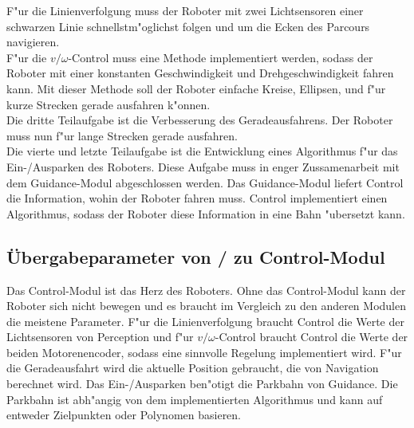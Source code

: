 F"ur die Linienverfolgung muss der Roboter mit zwei Lichtsensoren einer schwarzen Linie schnellstm"oglichst folgen und um die Ecken des Parcours navigieren. \\

F"ur die \(v/\omega\)-Control muss eine Methode implementiert werden, sodass der Roboter mit einer konstanten Geschwindigkeit und Drehgeschwindigkeit fahren kann. Mit dieser Methode soll der Roboter einfache Kreise, Ellipsen, und f"ur kurze Strecken gerade ausfahren k"onnen. \\

Die dritte Teilaufgabe ist die Verbesserung des Geradeausfahrens. Der Roboter muss nun f"ur lange Strecken gerade ausfahren. \\

Die vierte und letzte Teilaufgabe ist die Entwicklung eines Algorithmus f"ur das Ein-/Ausparken des Roboters. Diese Aufgabe muss in enger Zussamenarbeit mit dem Guidance-Modul abgeschlossen werden. Das Guidance-Modul liefert Control die Information, wohin der Roboter fahren muss. Control implementiert einen Algorithmus, sodass der Roboter diese Information in eine Bahn "ubersetzt kann.

\subsection{\"Ubergabeparameter von / zu Control-Modul}

Das Control-Modul ist das Herz des Roboters. Ohne das Control-Modul kann der Roboter sich nicht bewegen und es braucht im Vergleich zu den anderen Modulen die meistene Parameter. F"ur die Linienverfolgung braucht Control die Werte der Lichtsensoren von Perception und f"ur \(v/\omega\)-Control braucht Control die Werte der beiden Motorenencoder, sodass eine sinnvolle Regelung implementiert wird. F"ur die Geradeausfahrt wird die aktuelle Position gebraucht, die von Navigation berechnet wird. Das Ein-/Ausparken ben"otigt die Parkbahn von Guidance. Die Parkbahn ist abh"angig von dem implementierten Algorithmus und kann auf entweder Zielpunkten oder Polynomen basieren.
